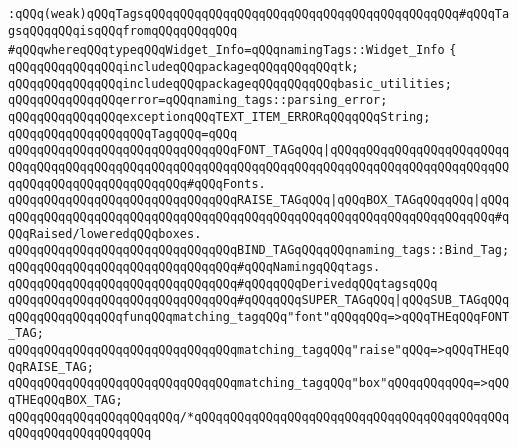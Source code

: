 \newline
\verb|:qQQq(weak)qQQqTagsqQQqqQQqqQQqqQQqqQQqqQQqqQQqqQQqqQQqqQQqqQQq#qQQqTagsqQQqqQQqisqQQqfromqQQqqQQqqQQq|\newline
\verb|#qQQqwhereqQQqtypeqQQqWidget_Info=qQQqnamingTags::Widget_Info|\newline
\newline
\verb|{|\newline
\verb|qQQqqQQqqQQqqQQqincludeqQQqpackageqQQqqQQqqQQqtk;|\newline
\verb|qQQqqQQqqQQqqQQqincludeqQQqpackageqQQqqQQqqQQqbasic_utilities;|\newline
\newline
\verb|qQQqqQQqqQQqqQQqerror=qQQqnaming_tags::parsing_error;|\newline
\newline
\verb|qQQqqQQqqQQqqQQqexceptionqQQqTEXT_ITEM_ERRORqQQqqQQqString;|\newline
\newline
\verb|qQQqqQQqqQQqqQQqqQQqTagqQQq=qQQq|\newline
\verb|qQQqqQQqqQQqqQQqqQQqqQQqqQQqqQQqFONT_TAGqQQq|\verb#|qQQqqQQqqQQqqQQqqQQqqQQqqQQqqQQqqQQqqQQqqQQqqQQqqQQqqQQqqQQqqQQqqQQqqQQqqQQqqQQqqQQqqQQqqQQqqQQqqQQqqQQqqQQqqQQqqQQqqQQq#\verb|#qQQqFonts.|\newline
\verb|qQQqqQQqqQQqqQQqqQQqqQQqqQQqqQQqRAISE_TAGqQQq|\verb#|qQQqBOX_TAGqQQqqQQq|qQQqqQQqqQQqqQQqqQQqqQQqqQQqqQQqqQQqqQQqqQQqqQQqqQQqqQQqqQQqqQQqqQQqqQQq#\verb|#qQQqRaised/loweredqQQqboxes.|\newline
\verb|qQQqqQQqqQQqqQQqqQQqqQQqqQQqqQQqBIND_TAGqQQqqQQqnaming_tags::Bind_Tag;qQQqqQQqqQQqqQQqqQQqqQQqqQQqqQQq#qQQqNamingqQQqtags.|\newline
\verb|qQQqqQQqqQQqqQQqqQQqqQQqqQQqqQQq#qQQqqQQqDerivedqQQqtagsqQQq|\newline
\verb|qQQqqQQqqQQqqQQqqQQqqQQqqQQqqQQq#qQQqqQQqSUPER_TAGqQQq|\verb#|qQQqSUB_TAGqQQq#\newline
\newline
\verb|qQQqqQQqqQQqqQQqfunqQQqmatching_tagqQQq"font"qQQqqQQq=>qQQqTHEqQQqFONT_TAG;|\newline
\verb|qQQqqQQqqQQqqQQqqQQqqQQqqQQqqQQqmatching_tagqQQq"raise"qQQq=>qQQqTHEqQQqRAISE_TAG;|\newline
\verb|qQQqqQQqqQQqqQQqqQQqqQQqqQQqqQQqmatching_tagqQQq"box"qQQqqQQqqQQq=>qQQqTHEqQQqBOX_TAG;|\newline
\verb|qQQqqQQqqQQqqQQqqQQqqQQq/*qQQqqQQqqQQqqQQqqQQqqQQqqQQqqQQqqQQqqQQqqQQqqQQqqQQqqQQqqQQqqQQq|\newline
